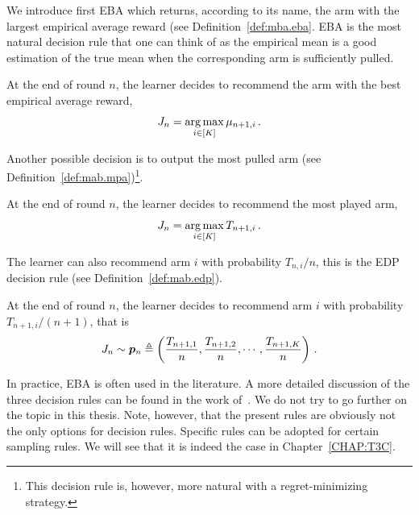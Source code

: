 We introduce first EBA which returns, according to its name, the arm with the largest empirical average reward (see Definition~\ref{def:mba.eba}. EBA is the most natural decision rule that one can think of as the empirical mean is a good estimation of the true mean when the corresponding arm is sufficiently pulled.

\begin{definition}
\begin{leftbar}[defnbar]\label{def:mba.eba}
    At the end of round $n$, the learner decides to recommend the arm with the best empirical average reward,
    \[
        J_n = \operatorname*{arg\,max}_{i\in[K]} \mu_{n+1,i}\,.
    \]
\end{leftbar}
\end{definition}

Another possible decision is to output the most pulled arm (see Definition~\ref{def:mab.mpa})\footnote{This decision rule is, however, more natural with a regret-minimizing strategy.}.

\begin{definition}
\begin{leftbar}[defnbar]\label{def:mab.mpa}
    At the end of round $n$, the learner decides to recommend the most played arm,
    \[
        J_n = \operatorname*{arg\,max}_{i\in[K]} T_{n+1,i}\,.
    \]
\end{leftbar}
\end{definition}

The learner can also recommend arm $i$ with probability $T_{n,i}/n$, this is the EDP decision rule (see Definition~\ref{def:mab.edp}).

\begin{definition}
\begin{leftbar}[defnbar]\label{def:mab.edp}
    At the end of round $n$, the learner decides to recommend arm $i$ with probability $T_{n+1,i}/(n+1)$, that is
    \[
        J_n \sim \boldsymbol{p}_{n}\triangleq\left(\frac{T_{n+1,1}}{n},\frac{T_{n+1,2}}{n},\cdots,\frac{T_{n+1,K}}{n}\right)\,.
    \]
\end{leftbar}
\end{definition}

In practice, EBA is often used in the literature. A more detailed discussion of the three decision rules can be found in the work of~\cite{bubeck2009pure}. We do not try to go further on the topic in this thesis. Note, however, that the present rules are obviously not the only options for decision rules. Specific rules can be adopted for certain sampling rules. We will see that it is indeed the case in Chapter~\ref{CHAP:T3C}.

